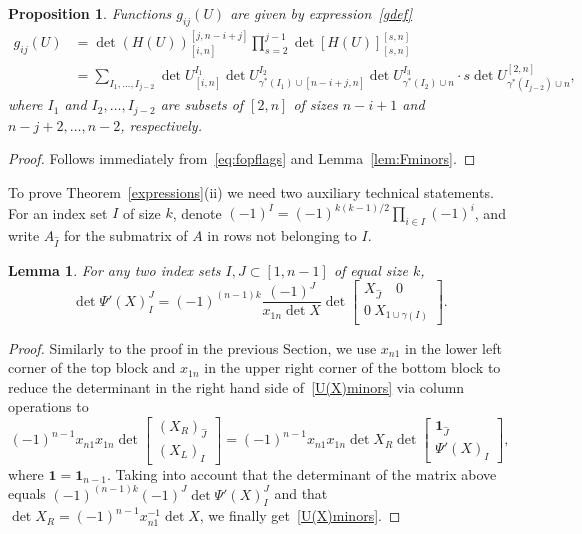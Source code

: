 \documentclass{amsart}
\newtheorem{lemma}[theorem]{Lemma}
\newtheorem{proposition}[theorem]{Proposition}
\theoremstyle{definition}
\theoremstyle{remark}
\numberwithin{equation}{section}
\numberwithin{theorem}{section}
\def\one{\mathbf 1}
\begin{document}
\begin{proposition}\label{gproof}
Functions $g_{ij}(U)$ are given by expression~\eqref{gdef}
\begin{equation}\label{gfuncorrect}
\begin{aligned}
g_{ij}(U)&=\det (H(U))_{[i,n]}^{[j,n-i+j]}\prod_{s=2}^{j-1}\det [H(U)]_{[s,n]}^{[s,n]}\\ 
&= \sum_{I_1,\ldots, I_{j-2}}
\det U^{I_1}_{[i,n]} \det U_{\gamma^*(I_1)\cup [n-i+j,n]}^{I_2}  \det U_{\gamma^*(I_2)\cup n}^{I_3} {\cdot}s  \det U_{\gamma^*(I_{j-2})\cup n}^{[2,n]} ,
\end{aligned}
\end{equation}
where $I_1$ and  $I_2, \ldots, I_{j-2}$ are subsets of $[2,n]$ of sizes $n-i +1$ and $n- j +2, \ldots, n- 2$, respectively.
\end{proposition}

\begin{proof} 
Follows immediately from~\eqref{eq:fopflags} and Lemma~\ref{lem:Fminors}.
\end{proof}

To prove Theorem~\ref{expressions}(ii) we need two auxiliary technical statements. 
For an index set $I$ of size $k$, denote $(-1)^I=(-1)^{k(k-1)/2}\prod_{i\in I} (-1)^i$, and write $A_{\hat I}$ for the submatrix of $A$ in rows not belonging to $I$.

\begin{lemma}
\label{lemma:U(X)minors}
For any two index sets $I,J\subset [1,n-1]$ of equal size $k$,
\begin{equation}
\label{U(X)minors}
\det \Psi'(X)_{I}^J = (-1)^{(n-1)k}\frac{(-1)^J}{x_{1n}\det X}
\det
\begin{bmatrix*}
X_{\hat J}\quad 0 \\
0\ X_{1\cup \gamma(I)}
\end{bmatrix*}.
\end{equation}
\end{lemma}

\begin{proof} Similarly to the proof in the previous Section, we use $x_{n1}$ in the lower left corner of the top block and $x_{1n}$ in the upper right  corner of the bottom block
to reduce the determinant in the right hand side of~\eqref{U(X)minors} via column operations to
\[
(-1)^{n-1} x_{n1}x_{1n} \det\begin{bmatrix} (X_R)_{\hat J} \\ (X_L)_I\end{bmatrix} = (-1)^{n-1} x_{n1}x_{1n}\det X_R \det\begin{bmatrix} \one_{\hat J} \\ \Psi'(X)_I\end{bmatrix},
\]
where $\one=\one_{n-1}$. Taking into account that the determinant of the matrix above equals 
$(-1)^{(n-1)k}(-1)^J\det \Psi'(X)_I^J$ and that $\det X_R=(-1)^{n-1}x_{n1}^{-1}\det X$, we finally get~\eqref{U(X)minors}.
\end{proof}
\end{document}
